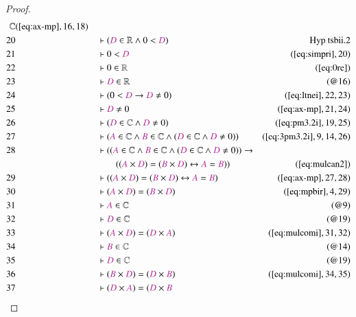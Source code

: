 \begin{proof}
\begin{align}
      \mathbb{C}&(\mbox{\ref{eq:ax-mp}},16,18)\notag
  \\ 20 &&  & \vdash ( \mc{D} \in \mathbb{R} \wedge 0 < \mc{D}
      )&\text{Hyp~tsbii.2}\notag%
  \\ 21 &&  & \vdash 0 < \mc{D}&(\mbox{\ref{eq:simpri}},20)\notag
  \\ 22 &&  & \vdash 0 \in \mathbb{R}&(\mbox{\ref{eq:0re}})\notag
  \\ 23 &&  & \vdash \mc{D} \in \mathbb{R}&(@16)\notag
  \\ 24 &&  & \vdash ( 0 < \mc{D} \rightarrow \mc{D} \ne 0
      )&(\mbox{\ref{eq:ltnei}},22,23)\notag
  \\ 25 &&  & \vdash \mc{D} \ne 0&(\mbox{\ref{eq:ax-mp}},21,24)\notag
  \\ 26 &&  & \vdash ( \mc{D} \in \mathbb{C} \wedge \mc{D} \ne 0
      )&(\mbox{\ref{eq:pm3.2i}},19,25)\notag
  \\ 27 &&  & \vdash ( \mc{A} \in \mathbb{C} \wedge \mc{B} \in \mathbb{C}
      \wedge ( \mc{D} \in \mathbb{C} \wedge \mc{D} \ne 0 )
      )&(\mbox{\ref{eq:3pm3.2i}},9,14,26)\notag
  \\ 28 &&  & \vdash ( ( \mc{A} \in \mathbb{C} \wedge \mc{B} \in \mathbb{C}
      \wedge ( \mc{D} \in \mathbb{C} \wedge \mc{D} \ne 0 )
      ) \rightarrow  \notag \\ & & & \qquad
     ( ( \mc{A} \times \mc{D} ) = ( \mc{B}
      \times \mc{D} ) \leftrightarrow \mc{A} = \mc{B} )
      )&(\mbox{\ref{eq:mulcan2}})\notag
  \\ 29 &&  & \vdash ( ( \mc{A} \times \mc{D} ) = ( \mc{B} \times \mc{D} )
      \leftrightarrow \mc{A} = \mc{B}
      )&(\mbox{\ref{eq:ax-mp}},27,28)\notag
  \\ 30 &&  & \vdash ( \mc{A} \times \mc{D} ) = ( \mc{B} \times \mc{D}
      )&(\mbox{\ref{eq:mpbir}},4,29)\notag
  \\ 31 &&  & \vdash \mc{A} \in \mathbb{C}&(@9)\notag
  \\ 32 &&  & \vdash \mc{D} \in \mathbb{C}&(@19)\notag
  \\ 33 &&  & \vdash ( \mc{A} \times \mc{D} ) = ( \mc{D} \times \mc{A}
      )&(\mbox{\ref{eq:mulcomi}},31,32)\notag
  \\ 34 &&  & \vdash \mc{B} \in \mathbb{C}&(@14)\notag
  \\ 35 &&  & \vdash \mc{D} \in \mathbb{C}&(@19)\notag
  \\ 36 &&  & \vdash ( \mc{B} \times \mc{D} ) = ( \mc{D} \times \mc{B}
      )&(\mbox{\ref{eq:mulcomi}},34,35)\notag
  \\ 37 &&  & \vdash ( \mc{D} \times \mc{A} ) = ( \mc{D} \times \mc{B}

\end{align}
\end{proof}
